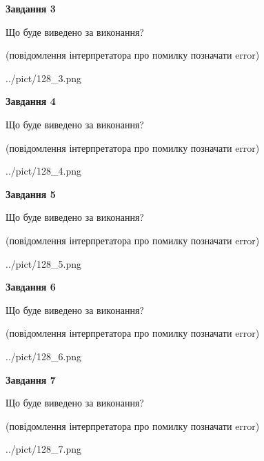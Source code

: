 \documentclass[12pt, ukrainian]{article}
\begin{document}
{\begin {large}
{\begin {center}\textbf{Завдання 3}\end {center}}\par
Що буде виведено за виконання?\par
 (повідомлення інтерпретатора про помилку позначати error)\par
\begin{center}
	{../pict/128_3.png}
\end{center}
\newpage

{\begin {center}\textbf{Завдання 4}\end {center}}\par
Що буде виведено за виконання?\par
 (повідомлення інтерпретатора про помилку позначати error)\par
\begin{center}
	{../pict/128_4.png}
\end{center}
\newpage

{\begin {center}\textbf{Завдання 5}\end {center}}\par
Що буде виведено за виконання?\par
 (повідомлення інтерпретатора про помилку позначати error)\par
\begin{center}
	{../pict/128_5.png}
\end{center}
\newpage

{\begin {center}\textbf{Завдання 6}\end {center}}\par
Що буде виведено за виконання?\par
 (повідомлення інтерпретатора про помилку позначати error)\par
\begin{center}
	{../pict/128_6.png}
\end{center}
\newpage

{\begin {center}\textbf{Завдання 7}\end {center}}\par
Що буде виведено за виконання?\par
 (повідомлення інтерпретатора про помилку позначати error)\par
\begin{center}
	{../pict/128_7.png}
\end{center}
\newpage


\end{large}}
\end{document}
